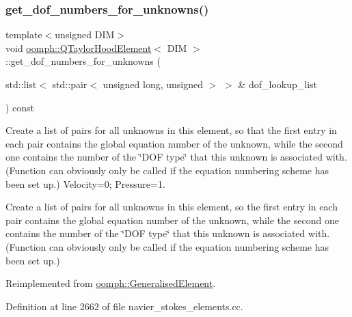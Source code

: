 \subsubsection{\texorpdfstring{get\+\_\+dof\+\_\+numbers\+\_\+for\+\_\+unknowns()}{get\_dof\_numbers\_for\_unknowns()}}
{\footnotesize\ttfamily template$<$unsigned D\+IM$>$ \\
void \hyperlink{classoomph_1_1QTaylorHoodElement}{oomph\+::\+Q\+Taylor\+Hood\+Element}$<$ D\+IM $>$\+::get\+\_\+dof\+\_\+numbers\+\_\+for\+\_\+unknowns (\begin{DoxyParamCaption}\item[{std\+::list$<$ std\+::pair$<$ unsigned long, unsigned $>$ $>$ \&}]{dof\+\_\+lookup\+\_\+list }\end{DoxyParamCaption}) const\hspace{0.3cm}{\ttfamily [virtual]}}



Create a list of pairs for all unknowns in this element, so that the first entry in each pair contains the global equation number of the unknown, while the second one contains the number of the \char`\"{}\+D\+O\+F type\char`\"{} that this unknown is associated with. (Function can obviously only be called if the equation numbering scheme has been set up.) Velocity=0; Pressure=1. 

Create a list of pairs for all unknowns in this element, so the first entry in each pair contains the global equation number of the unknown, while the second one contains the number of the \char`\"{}\+D\+O\+F type\char`\"{} that this unknown is associated with. (Function can obviously only be called if the equation numbering scheme has been set up.) 

Reimplemented from \hyperlink{classoomph_1_1GeneralisedElement_a069f59bfc3e607a5bebba52c6314d777}{oomph\+::\+Generalised\+Element}.



Definition at line 2662 of file navier\+\_\+stokes\+\_\+elements.\+cc.

\mbox{\label{classoomph_1_1QTaylorHoodElement_af14ad75ea276ed120e620646f48dcc0c}} 
